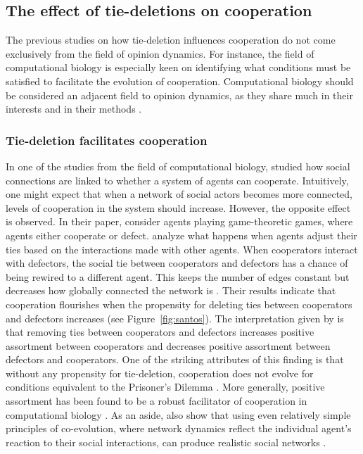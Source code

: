\documentclass[11pt]{article}
\begin{document}
\subsection{The effect of tie-deletions on cooperation}
The previous studies on how tie-deletion influences cooperation do not come exclusively from the field of opinion dynamics. For instance, the field of computational biology is especially keen on identifying what conditions must be satisfied to facilitate the evolution of cooperation. Computational biology should be considered an adjacent field to opinion dynamics, as they share much in their interests and in their methods \cite{dakin_dynamic_2018,melamed_strong_2016,pepper_mechanism_2002,santos_cooperation_2006, smaldino2019social}. 

\subsubsection{Tie-deletion facilitates cooperation}
\noindent In one of the studies from the field of computational biology,  studied how social connections are linked to whether a system of agents can cooperate. Intuitively, one might expect that when a network of social actors becomes more connected, levels of cooperation in the system should increase. However, the opposite effect is observed. In their paper,  consider agents playing game-theoretic games, where agents either cooperate or defect. 
 analyze what happens when agents adjust their ties based on the interactions made with other agents. When cooperators interact with defectors, the social tie between cooperators and defectors has a chance of being rewired to a different agent. This keeps the number of edges constant but decreases how globally connected the network is \cite{santos_cooperation_2006}. Their results indicate that cooperation flourishes when the propensity for deleting ties between cooperators and defectors increases (see Figure~\ref{fig:santos}). The interpretation given by  is that removing ties between cooperators and defectors increases positive assortment between cooperators and decreases positive assortment between defectors and cooperators. One of the striking attributes of this finding is that without any propensity for tie-deletion, cooperation does not evolve for conditions equivalent to the Prisoner’s Dilemma \cite{santos_cooperation_2006}. More generally, positive assortment has been found to be a robust facilitator of cooperation in computational biology \cite{boyd_coordinated_2010,dakin_dynamic_2018,melamed_strong_2016,pepper_mechanism_2002}. As an aside,  also show that using even relatively simple principles of co-evolution, where network dynamics reflect the individual agent's reaction to their social interactions, can produce realistic social networks \cite{santos_cooperation_2006}. 
\end{document}
